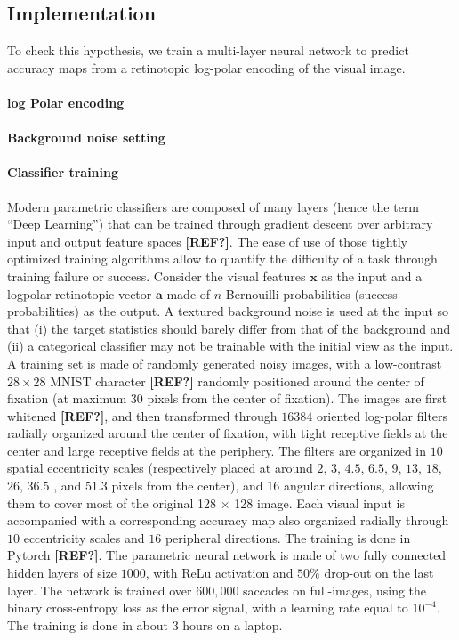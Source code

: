 \subsection{Implementation}
To check this hypothesis, we train a multi-layer neural network to predict accuracy maps from a retinotopic log-polar encoding of the visual image. 

\paragraph{log Polar encoding}

\paragraph{Background noise setting}

\paragraph{Classifier training}
Modern parametric classifiers are composed of many layers (hence the term ``Deep Learning'') that can be trained through gradient descent over arbitrary input and output feature spaces  {\bf [REF?]}. The ease of use of those tightly optimized training algorithms allow to quantify the difficulty of a task through training failure or success. Consider the visual features  $\boldsymbol{x}$ as the input and a logpolar retinotopic vector $\boldsymbol{a}$ made of $n$ Bernouilli probabilities (success probabilities) as the output. A textured background noise is used at the input so that (i) the target statistics should barely differ from that of the background and (ii) a  categorical classifier may not be trainable with the initial view as the input. A training set is made of randomly generated noisy images, with a low-contrast $28\times 28$ MNIST character   {\bf [REF?]} randomly positioned around the center of fixation (at maximum $30$ pixels from the center of fixation). The images are first whitened  {\bf [REF?]}, and then transformed through $16384$ oriented log-polar filters radially organized around the center of fixation, with tight receptive fields at the center and large receptive fields at the periphery. The filters are organized in $10$ spatial eccentricity scales (respectively placed at around $2$, $3$, $4.5$, $6.5$, $9$, $13$, $18$, $26$, $36.5$ , and $51.3$ pixels from the center), and $16$ angular directions, allowing them to cover most of the original 128 $\times$ 128 image. Each visual input is accompanied with a corresponding accuracy map also organized radially through $10$ eccentricity scales and $16$ peripheral directions. The training is done in Pytorch  {\bf [REF?]}. The parametric neural network is made of two fully connected hidden layers of size $1000$, with ReLu activation and $50 \%$ drop-out on the last layer. The network is trained over $600,000$ saccades on full-images, using the binary cross-entropy loss as the error signal, with a learning rate equal to $10^{-4}$. The training is done in about 3 hours on a laptop.


